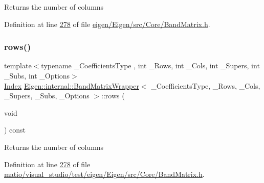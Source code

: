 \begin{DoxyReturn}{Returns}
the number of columns 
\end{DoxyReturn}


Definition at line \hyperlink{eigen_2_eigen_2src_2_core_2_band_matrix_8h_source_l00278}{278} of file \hyperlink{eigen_2_eigen_2src_2_core_2_band_matrix_8h_source}{eigen/\+Eigen/src/\+Core/\+Band\+Matrix.\+h}.

\mbox{\label{class_eigen_1_1internal_1_1_band_matrix_wrapper_a8d23b9d25729ac15c06591c810d13160}} 
\subsubsection{\texorpdfstring{rows()}{rows()}\hspace{0.1cm}{\footnotesize\ttfamily [2/2]}}
{\footnotesize\ttfamily template$<$typename \+\_\+\+Coefficients\+Type , int \+\_\+\+Rows, int \+\_\+\+Cols, int \+\_\+\+Supers, int \+\_\+\+Subs, int \+\_\+\+Options$>$ \\
\hyperlink{group___core___module_a554f30542cc2316add4b1ea0a492ff02}{Index} \hyperlink{class_eigen_1_1internal_1_1_band_matrix_wrapper}{Eigen\+::internal\+::\+Band\+Matrix\+Wrapper}$<$ \+\_\+\+Coefficients\+Type, \+\_\+\+Rows, \+\_\+\+Cols, \+\_\+\+Supers, \+\_\+\+Subs, \+\_\+\+Options $>$\+::rows (\begin{DoxyParamCaption}\item[{void}]{ }\end{DoxyParamCaption}) const\hspace{0.3cm}{\ttfamily [inline]}}

\begin{DoxyReturn}{Returns}
the number of columns 
\end{DoxyReturn}


Definition at line \hyperlink{matio_2visual__studio_2test_2eigen_2_eigen_2src_2_core_2_band_matrix_8h_source_l00278}{278} of file \hyperlink{matio_2visual__studio_2test_2eigen_2_eigen_2src_2_core_2_band_matrix_8h_source}{matio/visual\+\_\+studio/test/eigen/\+Eigen/src/\+Core/\+Band\+Matrix.\+h}.

\mbox{\label{class_eigen_1_1internal_1_1_band_matrix_wrapper_a146d5ceb44c93c8e0a48c207ad252a8f}} 
